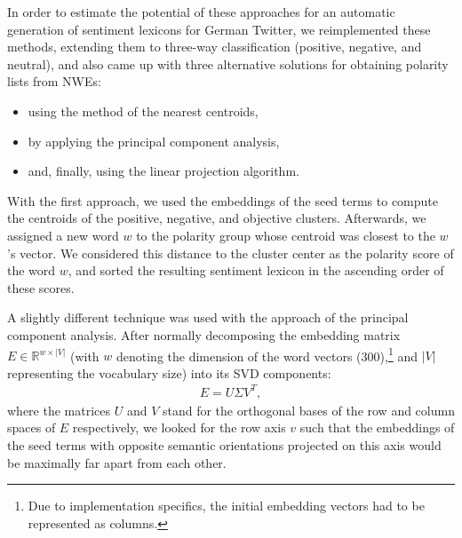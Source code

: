 In order to estimate the potential of these approaches for an
automatic generation of sentiment lexicons for German Twitter, we
reimplemented these methods, extending them to three-way
classification (positive, negative, and neutral), and also came up
with three alternative solutions for obtaining polarity lists from
NWEs:
\begin{itemize}
\item using the method of the nearest centroids,
\item by applying the principal component analysis,
\item and, finally, using the linear projection algorithm.
\end{itemize}

With the first approach, we used the embeddings of the seed terms to
compute the centroids of the positive, negative, and objective
clusters.  Afterwards, we assigned a new word $w$ to the polarity
group whose centroid was closest to the $w$'s vector.  We considered
this distance to the cluster center as the polarity score of the word
$w$, and sorted the resulting sentiment lexicon in the ascending order
of these scores.


A slightly different technique was used with the approach of the
principal component analysis.  After normally decomposing the
embedding matrix~$E\in\mathbb{R}^{w\times|V|}$ (with $w$ denoting the
dimension of the word vectors (300),\footnote{Due to implementation
  specifics, the initial embedding vectors had to be represented as
  columns.} and $|V|$ representing the vocabulary size) into its SVD
components:
\begin{align*}
  E = U \Sigma V^T,
\end{align*}
where the matrices $U$ and $V$ stand for the orthogonal bases of the
row and column spaces of $E$ respectively, we looked for the row axis
$v$ such that the embeddings of the seed terms with opposite semantic
orientations projected on this axis would be maximally far apart from
each other.


